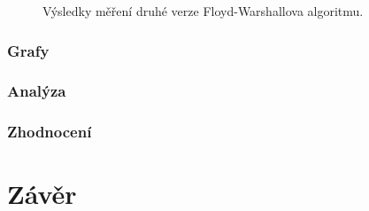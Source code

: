 \begin{figure}
    \centering
    \caption{Výsledky měření druhé verze Floyd-Warshallova algoritmu.}
    \label{f:cuda:vysledky:fw-v2}
\end{figure}

\subsubsection{Grafy} \label{f:cuda:grafy}

\subsubsection{Analýza}
\subsubsection{Zhodnocení}


\section{Závěr}




\clearpage





